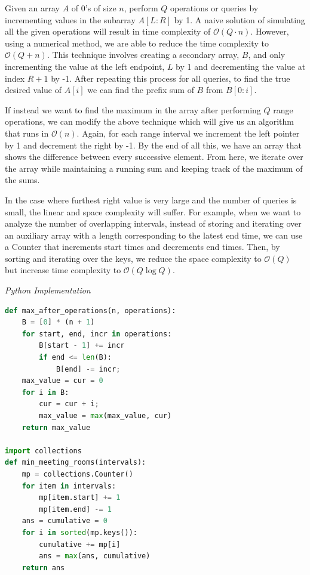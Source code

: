 \documentclass{article}
\newcommand{\bigO}{\mathcal{O}}
\begin{document}
    Given an array $A$ of 0's of size $n$, perform $Q$ operations or queries by incrementing values in the subarray $A[L: R]$ by 1. A naive solution of simulating all the given operations will result in time complexity of $\bigO(Q\cdot n)$. However, using a numerical method, we are able to reduce the time complexity to $\bigO(Q + n)$. This technique involves creating a secondary array, $B$, and only incrementing the value at the left endpoint, $L$ by 1 and decrementing the value at index $R + 1$ by -1. After repeating this process for all queries, to find the true desired value of $A[i]$ we can find the prefix sum of $B$ from $B[0:i]$.
    
    If instead we want to find the maximum in the array after performing $Q$ range operations, we can modify the above technique which will give us an algorithm that runs in $\bigO(n)$. Again, for each range interval we increment the left pointer by 1 and decrement the right by -1. By the end of all this, we have an array that shows the difference between every successive element. From here, we iterate over the array while maintaining a running sum and keeping track of the maximum of the sums.

    In the case where furthest right value is very large and the number of queries is small, the linear and space complexity will suffer. For example, when we want to analyze the number of overlapping intervals, instead of storing and iterating over an auxiliary array with a length corresponding to the latest end time, we can use a Counter that increments start times and decrements end times. Then, by sorting and iterating over the keys, we reduce the space complexity to $\bigO(Q)$ but increase time complexity to $\bigO(Q \log Q)$.
    
\vspace{8pt} \emph{Python Implementation}
\begin{lstlisting}[language=Python]
def max_after_operations(n, operations):
    B = [0] * (n + 1)
    for start, end, incr in operations:
        B[start - 1] += incr
        if end <= len(B):
            B[end] -= incr;
    max_value = cur = 0
    for i in B:
        cur = cur + i;
        max_value = max(max_value, cur)
    return max_value

import collections
def min_meeting_rooms(intervals):
    mp = collections.Counter()
    for item in intervals:
        mp[item.start] += 1
        mp[item.end] -= 1
    ans = cumulative = 0
    for i in sorted(mp.keys()):
        cumulative += mp[i]
        ans = max(ans, cumulative)
    return ans
\end{lstlisting}
\end{document}
